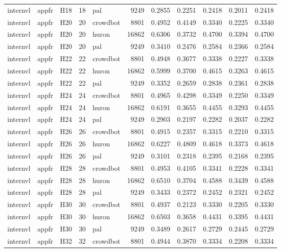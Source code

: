 \begin{table}[tbp]
\begin{tabular}{lllrlrrrrrr}
internvl & appfr & H18 & 18 & pal & 9249 & 0.2855 & 0.2251 & 0.2418 & 0.2011 & 0.2418 \\
internvl & appfr & H20 & 20 & crowdbot & 8801 & 0.4952 & 0.4149 & 0.3340 & 0.2225 & 0.3340 \\
internvl & appfr & H20 & 20 & huron & 16862 & 0.6306 & 0.3732 & 0.4700 & 0.3394 & 0.4700 \\
internvl & appfr & H20 & 20 & pal & 9249 & 0.3410 & 0.2476 & 0.2584 & 0.2366 & 0.2584 \\
internvl & appfr & H22 & 22 & crowdbot & 8801 & 0.4948 & 0.3677 & 0.3338 & 0.2227 & 0.3338 \\
internvl & appfr & H22 & 22 & huron & 16862 & 0.5999 & 0.3700 & 0.4615 & 0.3263 & 0.4615 \\
internvl & appfr & H22 & 22 & pal & 9249 & 0.3352 & 0.2659 & 0.2838 & 0.2361 & 0.2838 \\
internvl & appfr & H24 & 24 & crowdbot & 8801 & 0.4965 & 0.4298 & 0.3349 & 0.2250 & 0.3349 \\
internvl & appfr & H24 & 24 & huron & 16862 & 0.6191 & 0.3655 & 0.4455 & 0.3293 & 0.4455 \\
internvl & appfr & H24 & 24 & pal & 9249 & 0.2903 & 0.2197 & 0.2282 & 0.2037 & 0.2282 \\
internvl & appfr & H26 & 26 & crowdbot & 8801 & 0.4915 & 0.2357 & 0.3315 & 0.2210 & 0.3315 \\
internvl & appfr & H26 & 26 & huron & 16862 & 0.6227 & 0.4809 & 0.4618 & 0.3373 & 0.4618 \\
internvl & appfr & H26 & 26 & pal & 9249 & 0.3101 & 0.2318 & 0.2395 & 0.2168 & 0.2395 \\
internvl & appfr & H28 & 28 & crowdbot & 8801 & 0.4953 & 0.4105 & 0.3341 & 0.2228 & 0.3341 \\
internvl & appfr & H28 & 28 & huron & 16862 & 0.6510 & 0.3704 & 0.4588 & 0.3439 & 0.4588 \\
internvl & appfr & H28 & 28 & pal & 9249 & 0.3433 & 0.2372 & 0.2452 & 0.2321 & 0.2452 \\
internvl & appfr & H30 & 30 & crowdbot & 8801 & 0.4937 & 0.2123 & 0.3330 & 0.2205 & 0.3330 \\
internvl & appfr & H30 & 30 & huron & 16862 & 0.6503 & 0.3658 & 0.4431 & 0.3395 & 0.4431 \\
internvl & appfr & H30 & 30 & pal & 9249 & 0.3489 & 0.2617 & 0.2729 & 0.2445 & 0.2729 \\
internvl & appfr & H32 & 32 & crowdbot & 8801 & 0.4944 & 0.3870 & 0.3334 & 0.2208 & 0.3334 \\

\end{tabular}
\end{table}
